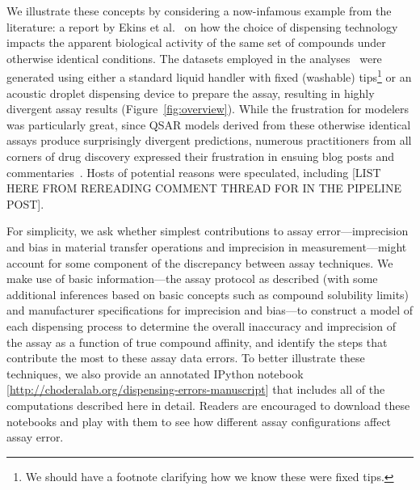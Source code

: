 \documentclass[aps,pre,twocolumn,nofootinbib,superscriptaddress,linenumbers]{revtex4-1}
\begin{document}
We illustrate these concepts by considering a now-infamous example from the literature: a report by Ekins et al.~\cite{ekins_dispensing_2013} on how the choice of dispensing technology impacts the apparent biological activity of the same set of compounds under otherwise identical conditions.
The datasets employed in the analyses~\cite{barlaam_novel_2009,barlaam_pyrimidine_2010} were generated using either a standard liquid handler with fixed (washable) tips\footnote{{\color{red}We should have a footnote clarifying how we know these were fixed tips.}} or an acoustic droplet dispensing device to prepare the assay, resulting in highly divergent assay results (Figure~\ref{fig:overview}).
While the frustration for modelers was particularly great, since QSAR models derived from these otherwise identical assays produce surprisingly divergent predictions, numerous practitioners from all corners of drug discovery expressed their frustration in ensuing blog posts and commentaries~\cite{lowe_drug_2015,evanko_serial_2013,ekins_what_2013}.
Hosts of potential reasons were speculated, including {\color{red}[LIST HERE FROM REREADING COMMENT THREAD FOR IN THE PIPELINE POST]}.

For simplicity, we ask whether simplest contributions to assay error---imprecision and bias in material transfer operations and imprecision in measurement---might account for some component of the discrepancy between assay techniques.
We make use of basic information---the assay protocol as described (with some additional inferences based on basic concepts such as compound solubility limits) and manufacturer specifications for imprecision and bias---to construct a model of each dispensing process to determine the overall inaccuracy and imprecision of the assay as a function of true compound affinity, and identify the steps that contribute the most to these assay data errors.
To better illustrate these techniques, we also provide an annotated IPython notebook [\url{http://choderalab.org/dispensing-errors-manuscript}] that includes all of the computations described here in detail.
Readers are encouraged to download these notebooks and play with them to see how different assay configurations affect assay error.
\end{document}
